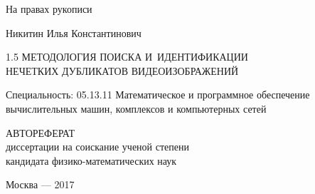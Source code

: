 \documentclass{.local/lib/classes/ndvr-super-article-standalone}
\begin{document}
    \begin{titlepage}
        \begin{flushright}
            На правах рукописи
        \end{flushright}
        \vspace{42pt}
        \begin{center}
            Никитин Илья Константинович
        \end{center}
        \vspace{42pt}
        \begin{center}
            \begin{spacing}{1.5}
                \textsf{
                    \uppercase{
                        \Large
                        Методология поиска и~идентификации \\
                        нечетких дубликатов видеоизображений
                    }
                }
            \end{spacing}
        \end{center}
        \vspace{42pt}
        \begin{center}
            Специальность: 05.13.11 
            Математическое и программное обеспечение
            вычислительных машин, комплексов и компьютерных сетей
        \end{center}
        \vspace{42pt}
        \begin{center}
            \uppercase{Автореферат} \\
            диссертации на соискание ученой степени\\
            кандидата физико-математических наук
        \end{center}
        \vfill
        \begin{center}
            Москва — 2017
        \end{center}
    \end{titlepage}

    \providecommand{\DefenseCouncilNumber}{ Д 123.456.78 }
    \newpage
\end{document}
